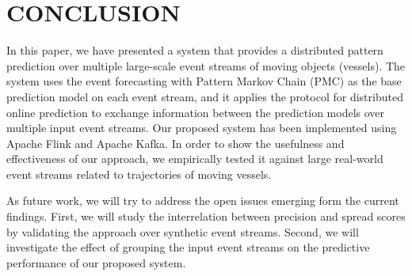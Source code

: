 
\section{CONCLUSION}
\label{sec:concl}
\par In this paper, we have presented a system that provides  a distributed pattern prediction over multiple large-scale event streams of moving objects (vessels). The system uses the event forecasting with Pattern Markov Chain (PMC) \cite{alevizos2017event} as the base prediction model on each event stream, and it applies the protocol for distributed online prediction \cite{kamp2014communication} to exchange information between the prediction models over multiple input event streams. Our proposed system has been implemented using Apache Flink and Apache Kafka. In order to show the usefulness and effectiveness of our approach, we empirically tested it against large real-world event streams related to trajectories of moving vessels.

\par As future work, we will try to address the open issues emerging form the current findings. First,  we will study the interrelation between precision and spread scores by validating the approach over synthetic event streams. Second, we will investigate the effect of grouping the input event streams on the predictive performance of our proposed system.